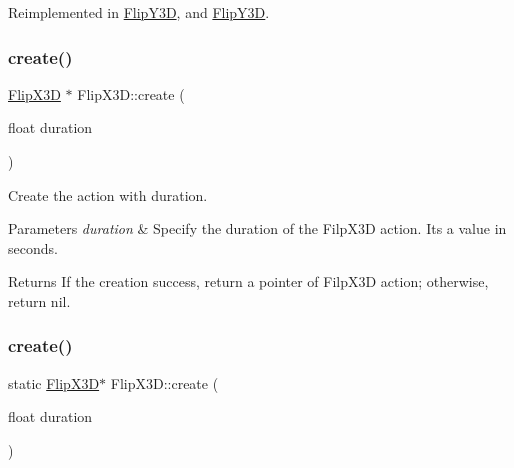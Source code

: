 Reimplemented in \hyperlink{classFlipY3D_a4553fc238ade03f1926ba12458ad073b}{Flip\+Y3D}, and \hyperlink{classFlipY3D_a797e0c0669bd83473d66dc8d77d49daa}{Flip\+Y3D}.

\mbox{\label{classFlipX3D_ac52365b40a986e1a7250e7018cf6eee3}} 
\subsubsection{\texorpdfstring{create()}{create()}\hspace{0.1cm}{\footnotesize\ttfamily [1/2]}}
{\footnotesize\ttfamily \hyperlink{classFlipX3D}{Flip\+X3D} $\ast$ Flip\+X3\+D\+::create (\begin{DoxyParamCaption}\item[{float}]{duration }\end{DoxyParamCaption})\hspace{0.3cm}{\ttfamily [static]}}



Create the action with duration. 


\begin{DoxyParams}{Parameters}
{\em duration} & Specify the duration of the Filp\+X3D action. It\textquotesingle{}s a value in seconds. \\
\hline
\end{DoxyParams}
\begin{DoxyReturn}{Returns}
If the creation success, return a pointer of Filp\+X3D action; otherwise, return nil. 
\end{DoxyReturn}
\mbox{\label{classFlipX3D_a9905d9a2b1772e5c399f5efaf1272313}} 
\subsubsection{\texorpdfstring{create()}{create()}\hspace{0.1cm}{\footnotesize\ttfamily [2/2]}}
{\footnotesize\ttfamily static \hyperlink{classFlipX3D}{Flip\+X3D}$\ast$ Flip\+X3\+D\+::create (\begin{DoxyParamCaption}\item[{float}]{duration }\end{DoxyParamCaption})\hspace{0.3cm}{\ttfamily [static]}}



